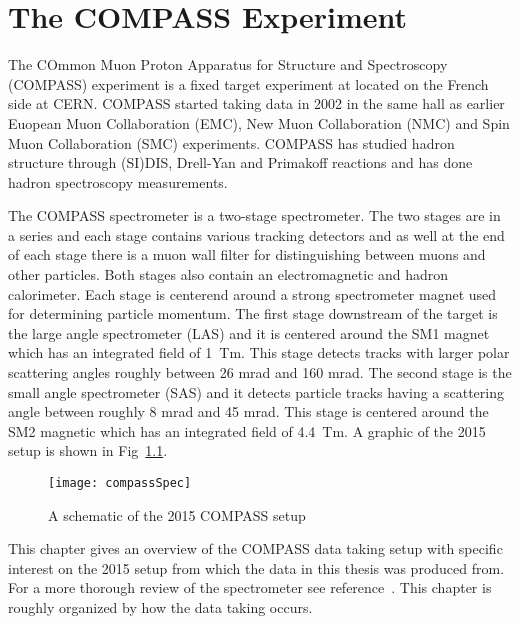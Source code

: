 \chapter{The COMPASS Experiment} 
\label{Chap::compass}
\ifpdf
\graphicspath{{Chapters/COMPASS/Figs/Raster/}{Chapters/COMPASS/Figs/PDF/}{Chapters/COMPASS/Figs/}}
\else \graphicspath{{Chapters/COMPASS/Figs/Vector/}{Chapters/COMPASS/Figs/}} \fi

The COmmon Muon Proton Apparatus for Structure and Spectroscopy (COMPASS)
experiment is a fixed target experiment at located on the French side at CERN.
COMPASS started taking data in 2002 in the same hall as earlier Euopean Muon
Collaboration (EMC), New Muon Collaboration (NMC) and Spin Muon Collaboration
(SMC) experiments.  COMPASS has studied hadron structure through (SI)DIS,
Drell-Yan and Primakoff reactions and has done hadron spectroscopy measurements.
\par

The COMPASS spectrometer is a two-stage spectrometer.  The two stages are in a
series and each stage contains various tracking detectors and as well at the end
of each stage there is a muon wall filter for distinguishing between muons and
other particles.  Both stages also contain an electromagnetic and hadron
calorimeter.  Each stage is centerend around a strong spectrometer magnet used
for determining particle momentum.  The first stage downstream of the target is
the large angle spectrometer (LAS) and it is centered around the SM1 magnet
which has an integrated field of 1~Tm.  This stage detects tracks with larger
polar scattering angles roughly between 26 mrad and 160 mrad.  The second stage
is the small angle spectrometer (SAS) and it detects particle tracks having a
scattering angle between roughly 8 mrad and 45 mrad.  This stage is centered
around the SM2 magnetic which has an integrated field of 4.4~Tm.  A graphic of
the 2015 setup is shown in Fig~\ref{fig::compassSpec}.\par

\begin{figure}[h!t]
  \centering
  \texttt{[image: compassSpec]}
  \caption{A schematic of the 2015 COMPASS setup}
  \label{fig::compassSpec}
\end{figure}

This chapter gives an overview of the COMPASS data taking setup with specific
interest on the 2015 setup from which the data in this thesis was produced from.
For a more thorough review of the spectrometer see
reference~\cite{compassSpec}.  This chapter is roughly organized by how the
data taking occurs.

